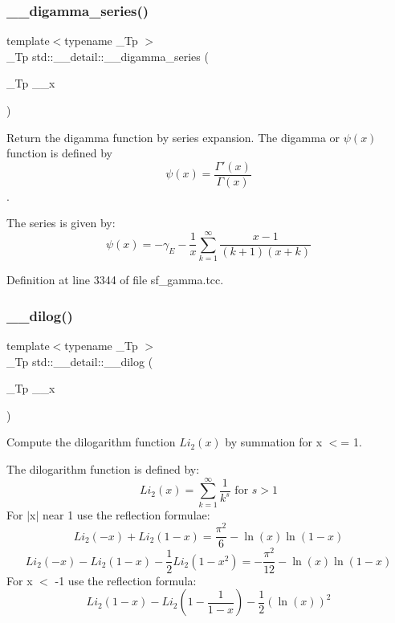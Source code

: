 \subsubsection{\texorpdfstring{\+\_\+\+\_\+digamma\+\_\+series()}{\_\_digamma\_series()}}
{\footnotesize\ttfamily template$<$typename \+\_\+\+Tp $>$ \\
\+\_\+\+Tp std\+::\+\_\+\+\_\+detail\+::\+\_\+\+\_\+digamma\+\_\+series (\begin{DoxyParamCaption}\item[{\+\_\+\+Tp}]{\+\_\+\+\_\+x }\end{DoxyParamCaption})}



Return the digamma function by series expansion. The digamma or $ \psi(x) $ function is defined by \[ \psi(x) = \frac{\Gamma'(x)}{\Gamma(x)} \]. 

The series is given by\+: \[ \psi(x) = -\gamma_E - \frac{1}{x} \sum_{k=1}^{\infty} \frac{x - 1}{(k + 1)(x + k)} \] 

Definition at line 3344 of file sf\+\_\+gamma.\+tcc.

\mbox{\label{namespacestd_1_1____detail_a5083a0c9fce3299593ca22e7dbaeaf19}} 
\subsubsection{\texorpdfstring{\+\_\+\+\_\+dilog()}{\_\_dilog()}}
{\footnotesize\ttfamily template$<$typename \+\_\+\+Tp $>$ \\
\+\_\+\+Tp std\+::\+\_\+\+\_\+detail\+::\+\_\+\+\_\+dilog (\begin{DoxyParamCaption}\item[{\+\_\+\+Tp}]{\+\_\+\+\_\+x }\end{DoxyParamCaption})}



Compute the dilogarithm function $ Li_2(x) $ by summation for x $<$= 1. 

The dilogarithm function is defined by\+: \[ Li_2(x) = \sum_{k=1}^{\infty} \frac{1}{k^{s}} \mbox{ for } s > 1 \] For $\vert$x$\vert$ near 1 use the reflection formulae\+: \[ Li_2(-x) + Li_2(1-x) = \frac{\pi^2}{6} - \ln(x) \ln(1-x) \] \[ Li_2(-x) - Li_2(1-x) - \frac{1}{2}Li_2(1-x^2) = -\frac{\pi^2}{12} - \ln(x) \ln(1-x) \] For x $<$ -\/1 use the reflection formula\+: \[ Li_2(1-x) - Li_2(1-\frac{1}{1-x}) - \frac{1}{2}(\ln(x))^2 \] 

